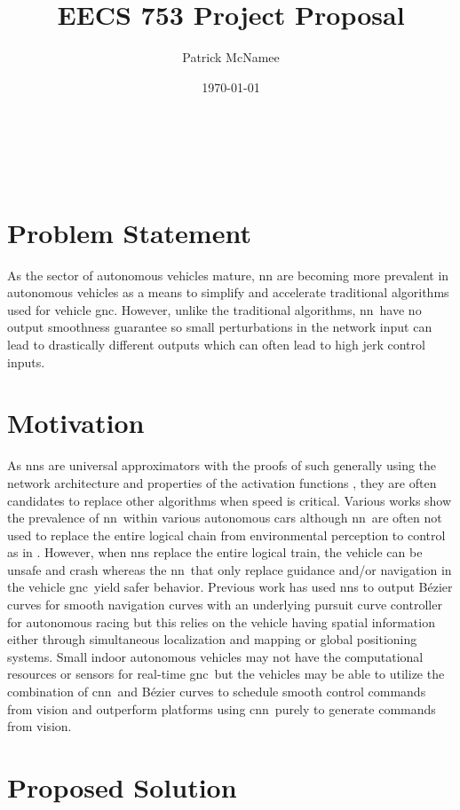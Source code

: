 \documentclass[12pt]{report}
\author{Patrick McNamee}
\title{EECS 753 Project Proposal}
\date{\today}
\newcommand{\CNN}{\acrshort{cnn}}
\newcommand{\GNC}{\acrshort{gnc}}
\newcommand{\NN}{\acrshort{nn}}
\begin{document}
\begin{center}
{\Large\bfseries\thetitle}\\
\theauthor\\
\thedate
\end{center}

\chapter{Problem Statement}

As the sector of autonomous vehicles mature, \acrfull{nn} are becoming more prevalent in autonomous vehicles as a means to simplify and accelerate traditional algorithms used for vehicle \acrfull{gnc}. However, unlike the traditional algorithms, \NN\ have no output smoothness guarantee so small perturbations in the network input can lead to drastically different outputs which can often lead to high jerk control inputs.

\chapter{Motivation}

As \acrlong{nn}s are universal approximators with the proofs of such generally using the network architecture and properties of the activation functions \cite{wang2021interval}, they are often candidates to replace other algorithms when speed is critical. Various works show the prevalence of \NN\ within various autonomous cars \cite{bechtel2018, pujol2019, kato2018} although \NN\ are often not used to replace the entire logical chain from environmental perception to control as in \cite{bechtel2018}. However, when \NN s replace the entire logical train, the vehicle can be unsafe and crash whereas the \NN\ that only replace guidance and/or navigation in the vehicle \GNC\ yield safer behavior. Previous work has used \NN s to output B\'ezier curves for smooth navigation curves with an underlying pursuit curve controller for autonomous racing \cite{trent2020iros} but this relies on the vehicle having spatial information either through simultaneous localization and mapping or global positioning systems. Small indoor autonomous vehicles may not have the computational resources or sensors for real-time \GNC\ but the vehicles may be able to utilize the combination of \CNN\ and B\'ezier curves to schedule smooth control commands from vision and outperform platforms using \CNN\ purely to generate commands from vision.

\chapter{Proposed Solution}
\end{document}
